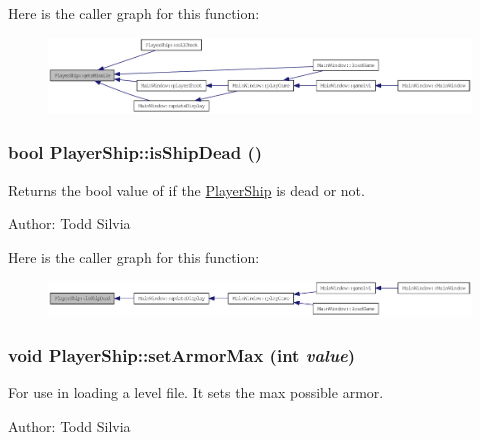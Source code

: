 Here is the caller graph for this function:\nopagebreak
\begin{figure}[H]
\begin{center}
\leavevmode
\includegraphics[width=413pt]{class_player_ship_a57d57596b57715d14fc4c488b3911aef_icgraph}
\end{center}
\end{figure}
\hypertarget{class_player_ship_a96bfd17f802f5d33d2083dad6c7240a0}{
\subsubsection[{isShipDead}]{\setlength{\rightskip}{0pt plus 5cm}bool PlayerShip::isShipDead ()}}
\label{class_player_ship_a96bfd17f802f5d33d2083dad6c7240a0}
Returns the bool value of if the \hyperlink{class_player_ship}{PlayerShip} is dead or not.

Author: Todd Silvia 

Here is the caller graph for this function:\nopagebreak
\begin{figure}[H]
\begin{center}
\leavevmode
\includegraphics[width=413pt]{class_player_ship_a96bfd17f802f5d33d2083dad6c7240a0_icgraph}
\end{center}
\end{figure}
\hypertarget{class_player_ship_af7378ca18726f28160c2ac30d091c9b8}{
\subsubsection[{setArmorMax}]{\setlength{\rightskip}{0pt plus 5cm}void PlayerShip::setArmorMax (int {\em value})}}
\label{class_player_ship_af7378ca18726f28160c2ac30d091c9b8}
For use in loading a level file. It sets the max possible armor.

Author: Todd Silvia 


